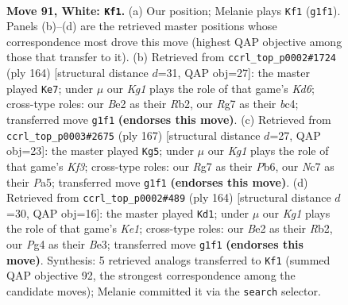 \documentclass[11pt]{article}
\begin{document}
\clearpage

\begin{figure}[p]\centering
\begin{subfigure}{0.46\textwidth}\centering
\resizebox{\linewidth}{!}{%
\newchessgame
\chessboard[
  setfen={8/2N3R1/8/5P2/np2b1P1/6k1/4B3/6K1 w - - 4 91},
  showmover=false,
  pgfstyle=straightmove, color=movearrow, markmove={g1-f1}
]}
\caption{}
\end{subfigure}\hfill
\begin{subfigure}{0.46\textwidth}\centering
\resizebox{\linewidth}{!}{%
\newchessgame
\chessboard[
  setfen={8/8/3Kp3/6r1/2b5/4kP2/1R4P1/8 w - - 28 83},
  showmover=false,
  pgfstyle=straightmove, color=movearrow, markmove={d6-e7}
]}
\caption{}
\end{subfigure}
\\[4pt]
\begin{subfigure}{0.46\textwidth}\centering
\resizebox{\linewidth}{!}{%
\newchessgame
\chessboard[
  setfen={8/8/1p3k2/p2K4/1r1p4/3B4/8/3R4 b - - 5 84},
  showmover=false,
  pgfstyle=straightmove, color=movearrow, markmove={f6-g5}
]}
\caption{}
\end{subfigure}\hfill
\begin{subfigure}{0.46\textwidth}\centering
\resizebox{\linewidth}{!}{%
\newchessgame
\chessboard[
  setfen={8/8/6p1/2P2b2/2r5/4Bk2/1R3P2/4K3 w - - 51 83},
  showmover=false,
  pgfstyle=straightmove, color=movearrow, markmove={e1-d1}
]}
\caption{}
\end{subfigure}
\caption{\textbf{Move 91, White: \texttt{Kf1}.} (a) Our position; Melanie plays \texttt{Kf1} (\texttt{g1f1}). Panels (b)--(d) are the retrieved master positions whose correspondence most drove this move (highest QAP objective among those that transfer to it). (b) Retrieved from \texttt{ccrl\_top\_p0002\#1724} (ply 164) [structural distance $d$=31, QAP obj=27]: the master played \texttt{Ke7}; under $\mu$ our \emph{Kg1} plays the role of that game's \emph{Kd6}; cross-type roles: our \emph{B}e2 as their \emph{R}b2, our \emph{R}g7 as their \emph{b}c4; transferred move \texttt{g1f1} \textbf{(endorses this move)}. (c) Retrieved from \texttt{ccrl\_top\_p0003\#2675} (ply 167) [structural distance $d$=27, QAP obj=23]: the master played \texttt{Kg5}; under $\mu$ our \emph{Kg1} plays the role of that game's \emph{Kf3}; cross-type roles: our \emph{R}g7 as their \emph{P}b6, our \emph{N}c7 as their \emph{P}a5; transferred move \texttt{g1f1} \textbf{(endorses this move)}. (d) Retrieved from \texttt{ccrl\_top\_p0002\#489} (ply 164) [structural distance $d$=30, QAP obj=16]: the master played \texttt{Kd1}; under $\mu$ our \emph{Kg1} plays the role of that game's \emph{Ke1}; cross-type roles: our \emph{B}e2 as their \emph{R}b2, our \emph{P}g4 as their \emph{B}e3; transferred move \texttt{g1f1} \textbf{(endorses this move)}. Synthesis: 5 retrieved analogs transferred to \texttt{Kf1} (summed QAP objective 92, the strongest correspondence among the candidate moves); Melanie committed it via the \texttt{search} selector.}
\label{fig:thought-m180}
\end{figure}
\end{document}
